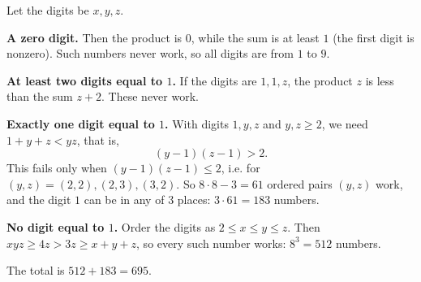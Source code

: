 Let the digits be $x,y,z$.

\textbf{A zero digit.} Then the product is $0$, while the sum is at least $1$ (the first digit is nonzero). Such numbers never work, so all digits are from $1$ to $9$.

\textbf{At least two digits equal to $1$.} If the digits are $1,1,z$, the product $z$ is less than the sum $z+2$. These never work.

\textbf{Exactly one digit equal to $1$.} With digits $1,y,z$ and $y,z\ge2$, we need $1+y+z<yz$, that is,
\[(y-1)(z-1)>2 .\]
This fails only when $(y-1)(z-1)\le2$, i.e. for $(y,z)=(2,2),(2,3),(3,2)$. So $8\cdot8-3=61$ ordered pairs $(y,z)$ work, and the digit $1$ can be in any of $3$ places: $3\cdot61=183$ numbers.

\textbf{No digit equal to $1$.} Order the digits as $2\le x\le y\le z$. Then $xyz\ge4z>3z\ge x+y+z$, so every such number works: $8^3=512$ numbers.

The total is $512+183=\boxed{695}$.
